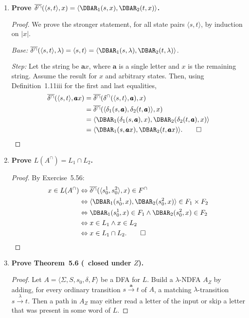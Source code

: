 \begin{enumerate}[{5.}1. ]
\item \textbf{Prove $\overline{\delta^\cap}(\langle s,t\rangle,x)=\langle\DBAR_1(s,x),\DBAR_2(t,x)\rangle$.}

  \begin{proof}
  We prove the stronger statement, for all state pairs $\langle s,t\rangle$, by
  induction on $|x|$.

  \emph{Base:}  $\overline{\delta^\cap}(\langle s,t\rangle,\lambda)=\langle s,t\rangle=\langle\DBAR_1(s,\lambda),\DBAR_2(t,\lambda)\rangle$.

  \emph{Step:}  Let the string be $\pmb{a}x$, where $\pmb{a}$ is a single letter
  and $x$ is the remaining string. Assume the result for $x$ and arbitrary
  states. Then, using Definition~1.11iii for the first and last equalities,
  \begin{align*}
  \overline{\delta^\cap}(\langle s,t\rangle,\pmb{a}x)
  &=\overline{\delta^\cap}(\delta^\cap(\langle s,t\rangle,\pmb{a}),x) \\
  &=\overline{\delta^\cap}(\langle\delta_1(s,\pmb{a}),\delta_2(t,\pmb{a})\rangle,x) \\
  &=\langle\DBAR_1(\delta_1(s,\pmb{a}),x),\DBAR_2(\delta_2(t,\pmb{a}),x)\rangle \\
  &=\langle\DBAR_1(s,\pmb{a}x),\DBAR_2(t,\pmb{a}x)\rangle. \qed
  \end{align*}
  \end{proof}

\item \textbf{Prove $L(A^\cap)=L_1\cap L_2$.}

\begin{proof}
By Exercise~5.56:
\begin{align*}
  x\in L(A^\cap)
  &\Leftrightarrow\overline{\delta^\cap}(\langle s^1_0,s^2_0\rangle,x)\in F^\cap \\
  &\Leftrightarrow\langle\DBAR_1(s^1_0,x),\DBAR_2(s^2_0,x)\rangle\in F_1\times F_2 \\
  &\Leftrightarrow\DBAR_1(s^1_0,x)\in F_1\wedge\DBAR_2(s^2_0,x)\in F_2 \\
  &\Leftrightarrow x\in L_1\wedge x\in L_2 \\
  &\Leftrightarrow x\in L_1\cap L_2. \qed
\end{align*}
\end{proof}

\item \textbf{Prove Theorem~5.6 (\DSIG\ closed under $Z$).}

\begin{proof}
Let $A=\langle\Sigma,S,s_0,\delta,F\rangle$ be a DFA for $L$.  Build a
$\lambda$-NDFA $A_Z$ by adding, for every ordinary transition
$s\xrightarrow{\pmb{a}}t$ of $A$, a matching $\lambda$-transition
$s\xrightarrow{\lambda}t$.  Then a path in $A_Z$ may either read a letter of the
input or skip a letter that was present in some word of $L$.


\end{proof}
\end{enumerate}
